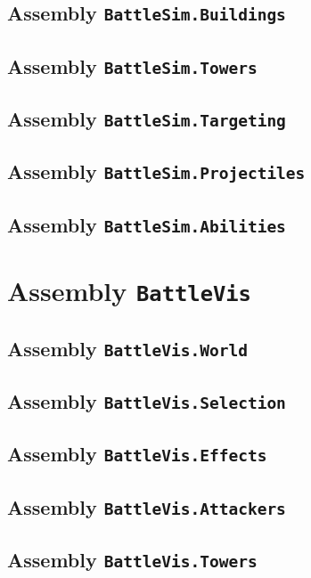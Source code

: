 \subsection{Assembly \texttt{BattleSim.Buildings}}

\subsection{Assembly \texttt{BattleSim.Towers}}

\subsection{Assembly \texttt{BattleSim.Targeting}}

\subsection{Assembly \texttt{BattleSim.Projectiles}}

\subsection{Assembly \texttt{BattleSim.Abilities}}

\section{Assembly \texttt{BattleVis}}

\subsection{Assembly \texttt{BattleVis.World}}

\subsection{Assembly \texttt{BattleVis.Selection}}

\subsection{Assembly \texttt{BattleVis.Effects}}

\subsection{Assembly \texttt{BattleVis.Attackers}}

\subsection{Assembly \texttt{BattleVis.Towers}}

